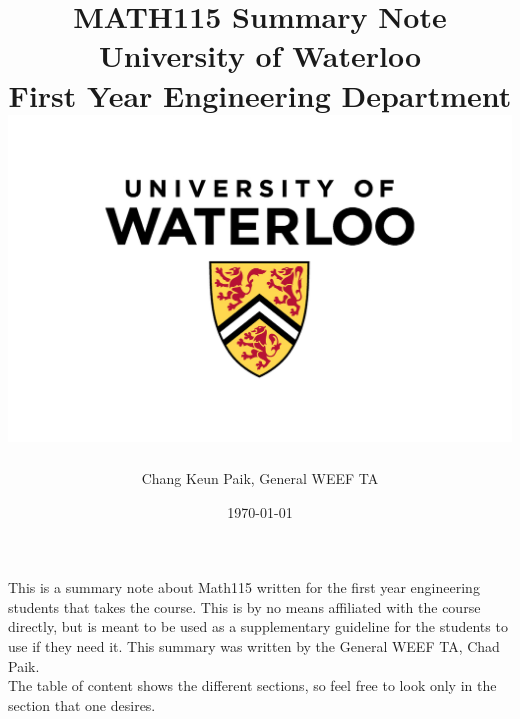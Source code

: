 \documentclass[12pt]{article}
\begin{document}

\begin{titlepage}
{\centering
\title{{MATH115 Summary Note}\\
{\huge University of Waterloo}\\
{\small  First Year Engineering Department}\\
{\includegraphics[scale=0.5]{UW.jpg}}}
\author{ \begin{tabular} {c} Chang Keun Paik, General WEEF TA \\
 \end{tabular}}
 \date {\today}
\maketitle
\par}
\thispagestyle{empty}
\end{titlepage}
\tableofcontents
\thispagestyle{empty}

\listoffigures
\thispagestyle{empty}
\clearpage

\setcounter{page}{1}


This is a summary note about Math115 written for the first year engineering students that takes the course. This is by no means affiliated with the course directly, but is meant to be used as a supplementary guideline for the students to use if they need it. This summary was written by the General WEEF TA, Chad Paik.\\
The table of content shows the different sections, so feel free to look only in the section that one desires.
\end{document}
